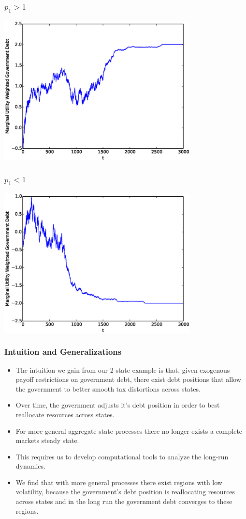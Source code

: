 \documentclass{beamer}
\begin{document}
\begin{frame}
	\frametitle{$p_1 > 1$}
	\begin{center}
	\includegraphics[width=4in]{Images/port1.eps}
	\end{center}
\end{frame}

\begin{frame}
	\frametitle{$p_1 < 1$}
	\begin{center}
	\includegraphics[width=4in]{Images/port2.eps}
	\end{center}
\end{frame}

\begin{frame}
	\frametitle{Intuition and Generalizations}
	\begin{itemize}
		\item The intuition we gain from our 2-state example is that, given exogenous payoff restrictions on government debt, there exist debt positions that allow the government to better smooth tax distortions across states.
		\item  Over time, the government adjusts it's debt position in order to best reallocate resources across states.
		\item  For more general aggregate state processes there no longer exists a complete markets steady state.
		\item  This requires us to develop computational tools to analyze the long-run dynamics.
		\item  We find that with more general processes there exist regions with low volatility, because the government's debt position is reallocating resources across states and in the long run the government debt converges to these regions.
	\end{itemize}
\end{frame}
\end{document}
